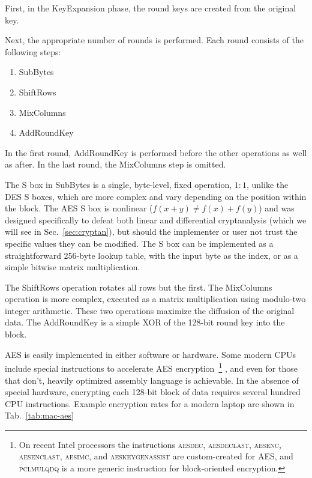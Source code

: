 First, in the KeyExpansion phase, the round keys are created from the original key.

Next, the appropriate number of rounds is performed. Each round consists of the following steps:

\begin{enumerate}
\item SubBytes
\item ShiftRows
\item MixColumns
\item AddRoundKey
\end{enumerate}

In the first round, AddRoundKey is performed before the other operations as well as after. In the last round, the MixColumns step is omitted.

The S box in SubBytes is a single, byte-level, fixed operation, $1:1$,
unlike the DES S boxes, which are more complex and vary depending on
the position within the block. The AES S box is nonlinear ($f(x+y) \ne
f(x)+f(y)$) and was designed specifically to defeat both linear and
differential cryptanalysis (which we will see in
Sec.~\ref{sec:cryptan}), but should the implementer or user not trust the specific values they can be modified. The S box can be implemented as a straightforward 256-byte lookup table, with the input byte as the index, or as a simple bitwise matrix multiplication.

The ShiftRows operation rotates all rows but the first. The MixColumns operation is more complex, executed as a matrix multiplication using modulo-two integer arithmetic. These two operations maximize the diffusion of the original data. The AddRoundKey is a simple XOR of the 128-bit round key into the block.

AES is easily implemented in either software or hardware. Some modern
CPUs include special instructions to accelerate AES
encryption~\footnote{On recent Intel processors the instructions
  \textsc{aesdec}, \textsc{aesdeclast}, \textsc{aesenc},
  \textsc{aesenclast}, \textsc{aesimc}, and \textsc{aeskeygenassist}
  are custom-created for AES, and \textsc{pclmulqdq} is a more generic
  instruction for block-oriented encryption.} , and even for those that
don't, heavily optimized assembly language is achievable.  In the
absence of special hardware, encrypting each 128-bit block of data
requires several hundred CPU instructions. Example encryption rates
for a modern laptop are shown in Tab.~\ref{tab:mac-aes}


